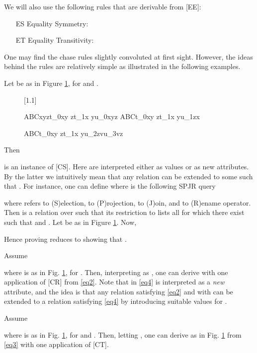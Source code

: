 \documentclass[envcountset]{llncs}
\begin{document}
 We will also use the following rules that are derivable from [EE]:\\
\begin{itemize}
\item[ES] Equality Symmetry: 
\item[ET] Equality Transitivity: 




\end{itemize}
One may find the chase rules  slightly convoluted at first sight. However, the ideas behind the rules are relatively simple as illustrated in the following examples. 






\begin{ex}
Let  be as in Figure \ref{3}, for  and .
\begin{figure}[h]
\center\scalebox{1.2}[1.1]{
ABCxyzt_0xy zt_1x yu_0xyz\quad 
ABCt_0xy zt_1x yu_1zx
\quad 

ABCt_0xy zt_1x yu_2zvu_3vz
}\caption{\label{3}}
\end{figure}
Then

is an instance of [CS].  Here   are interpreted either as  values or as new attributes. By the latter we intuitively mean that any relation  can be extended to some   such that . For instance, one can define  where  is the following SPJR  query

where  refers to (S)election,  to (P)rojection,  to (J)oin, and  to (R)ename operator. Then  is a relation over  such that its restriction to  lists all  for which there exist  such that  and . Let  be as in Figure \ref{3}. 
Now,

Hence proving  reduces to showing that .
\end{ex}





\begin{ex}
 Assume 

where  is as in Fig. \ref{3}, for . Then, interpreting  as , one can derive with one application of [CR]   
 from \eqref{eq2}. Note that in \eqref{eq4}  is interpreted as a \emph{new} attribute, and the idea is that any relation   satisfying \eqref{eq2} and with   can be extended to a relation  satisfying \eqref{eq4}  by introducing  suitable values for .
\end{ex}


\begin{ex}
Assume

where  is as in Fig. \ref{3}, for  and .
Then, letting , one can derive  as in Fig. \ref{3} from  \eqref{eq3} with one application of [CT].





\end{ex}
\end{document}

